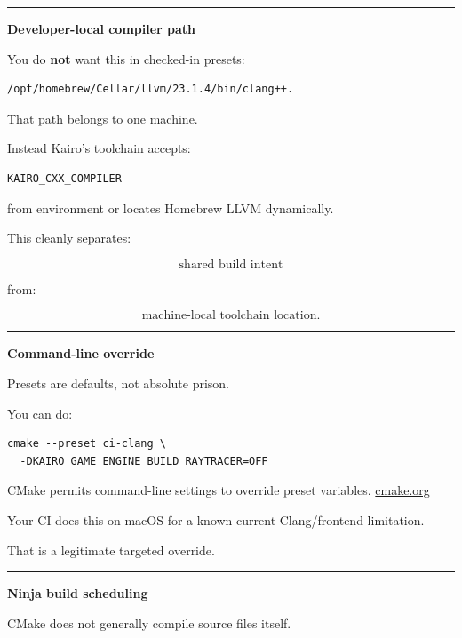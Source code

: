 \begin{center}\rule{0.5\linewidth}{0.5pt}\end{center}

\textbf{Developer-local compiler path}

You do \textbf{not} want this in checked-in presets:

\begin{verbatim}
/opt/homebrew/Cellar/llvm/23.1.4/bin/clang++.
\end{verbatim}

That path belongs to one machine.

Instead Kairo's toolchain accepts:

\begin{verbatim}
KAIRO_CXX_COMPILER
\end{verbatim}

from environment or locates Homebrew LLVM dynamically.

This cleanly separates:

\[
\text{shared build intent}
\]

from:

\[
\text{machine-local toolchain location}.
\]

\begin{center}\rule{0.5\linewidth}{0.5pt}\end{center}

\textbf{Command-line override}

Presets are defaults, not absolute prison.

You can do:

\begin{verbatim}
cmake --preset ci-clang \
  -DKAIRO_GAME_ENGINE_BUILD_RAYTRACER=OFF
\end{verbatim}

CMake permits command-line settings to override preset variables. \href{https://cmake.org/cmake/help/git-stage/guide/tutorial/Configuration\%20and\%20Cache\%20Variables.html?utm_source=chatgpt.com}{cmake.org}

Your CI does this on macOS for a known current Clang/frontend limitation.

That is a legitimate targeted override.

\begin{center}\rule{0.5\linewidth}{0.5pt}\end{center}

\textbf{Ninja build scheduling}

CMake does not generally compile source files itself.

